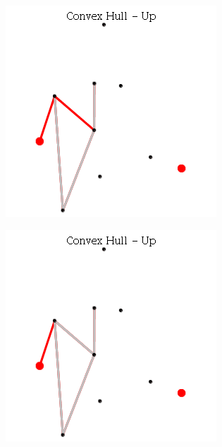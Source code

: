 \documentclass[12pt]{article}
\begin{document}
\begin{figure}[h]
\begin{subfigure}[h]{0.275\linewidth}
              \caption{}
            \end{subfigure}
            \begin{subfigure}[h]{0.275\linewidth}
              \includegraphics[width=\linewidth]{GIF/Up-8}
              \caption{}
            \end{subfigure}
            \begin{subfigure}[h]{0.275\linewidth}
              \includegraphics[width=\linewidth]{GIF/Up-9}

\end{subfigure}
\end{figure}
\end{document}

